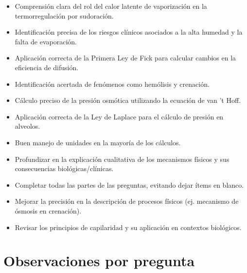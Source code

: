 \documentclass[11pt,a4paper]{article}
\begin{document}
\vspace{4pt}
\begin{minipage}[t]{0.48\linewidth}
  \begin{tcolorbox}[cajaFortaleza, title={Fortalezas}]
\begin{itemize}[leftmargin=1.5em, itemsep=2pt]
  \item Comprensión clara del rol del calor latente de vaporización en la termorregulación por sudoración.
  \item Identificación precisa de los riesgos clínicos asociados a la alta humedad y la falta de evaporación.
  \item Aplicación correcta de la Primera Ley de Fick para calcular cambios en la eficiencia de difusión.
  \item Identificación acertada de fenómenos como hemólisis y crenación.
  \item Cálculo preciso de la presión osmótica utilizando la ecuación de van 't Hoff.
  \item Aplicación correcta de la Ley de Laplace para el cálculo de presión en alveolos.
  \item Buen manejo de unidades en la mayoría de los cálculos.
\end{itemize}
  \end{tcolorbox}
\end{minipage}
\hfill
\begin{minipage}[t]{0.48\linewidth}
  \begin{tcolorbox}[cajaMejora, title={Areas de mejora}]
\begin{itemize}[leftmargin=1.5em, itemsep=2pt]
  \item Profundizar en la explicación cualitativa de los mecanismos físicos y sus consecuencias biológicas/clínicas.
  \item Completar todas las partes de las preguntas, evitando dejar ítems en blanco.
  \item Mejorar la precisión en la descripción de procesos físicos (ej. mecanismo de ósmosis en crenación).
  \item Revisar los principios de capilaridad y su aplicación en contextos biológicos.
\end{itemize}
  \end{tcolorbox}
\end{minipage}

\section*{Observaciones por pregunta}
\end{document}
